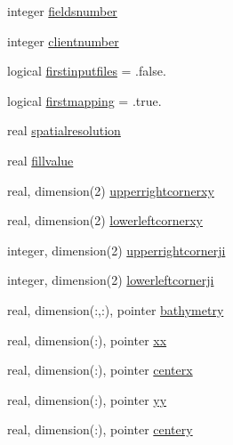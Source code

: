 \begin{DoxyCompactItemize}
\item 
integer \mbox{\hyperlink{structmodulelevitusformat_1_1t__levitusformat_aa022502a72a602064800da1f5f631b82}{fieldsnumber}}
\item 
integer \mbox{\hyperlink{structmodulelevitusformat_1_1t__levitusformat_a587e8b9e294a1e5e2986213942907b0e}{clientnumber}}
\item 
logical \mbox{\hyperlink{structmodulelevitusformat_1_1t__levitusformat_afe5fc2bba32e5b2dfb80584e7727941c}{firstinputfiles}} = .false.
\item 
logical \mbox{\hyperlink{structmodulelevitusformat_1_1t__levitusformat_af61245ea414430dc5fbb10aa7d194bdd}{firstmapping}} = .true.
\item 
real \mbox{\hyperlink{structmodulelevitusformat_1_1t__levitusformat_a6d9ced9aeee15dde045d030e1d029501}{spatialresolution}}
\item 
real \mbox{\hyperlink{structmodulelevitusformat_1_1t__levitusformat_a934ab53f7bcf6d3016526b7b780c2a28}{fillvalue}}
\item 
real, dimension(2) \mbox{\hyperlink{structmodulelevitusformat_1_1t__levitusformat_aad846d1b5c4404ad700420e7fe24fca8}{upperrightcornerxy}}
\item 
real, dimension(2) \mbox{\hyperlink{structmodulelevitusformat_1_1t__levitusformat_aa0d54e11086c2b0e1605e21f482b2f9e}{lowerleftcornerxy}}
\item 
integer, dimension(2) \mbox{\hyperlink{structmodulelevitusformat_1_1t__levitusformat_a5060b5043068d14a898e790c07abe977}{upperrightcornerji}}
\item 
integer, dimension(2) \mbox{\hyperlink{structmodulelevitusformat_1_1t__levitusformat_a39cdea582c72d62649325fbe1983a238}{lowerleftcornerji}}
\item 
real, dimension(\+:,\+:), pointer \mbox{\hyperlink{structmodulelevitusformat_1_1t__levitusformat_a250a910b40053f34e429b24b5d9a9a46}{bathymetry}}
\item 
real, dimension(\+:), pointer \mbox{\hyperlink{structmodulelevitusformat_1_1t__levitusformat_a19162f1521fa3100aedd447abc3d3cb0}{xx}}
\item 
real, dimension(\+:), pointer \mbox{\hyperlink{structmodulelevitusformat_1_1t__levitusformat_a699813f7b45ccd2a7aa2f10fd7b1627f}{centerx}}
\item 
real, dimension(\+:), pointer \mbox{\hyperlink{structmodulelevitusformat_1_1t__levitusformat_af6a015748db8189c6655350806f96682}{yy}}
\item 
real, dimension(\+:), pointer \mbox{\hyperlink{structmodulelevitusformat_1_1t__levitusformat_a0f1d4a1f4c835fcb967945e894b0c808}{centery}}

\end{DoxyCompactItemize}
